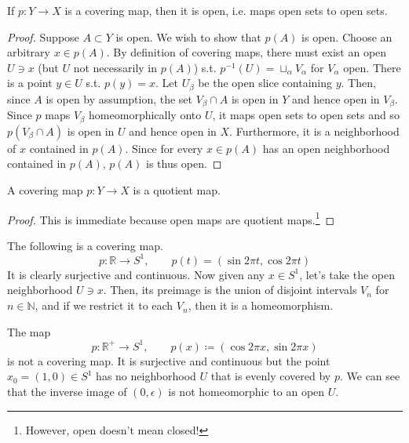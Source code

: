  \begin{theorem}
    If $p: Y \to X$ is a covering map, then it is open, i.e. maps open sets to open sets. 
  \end{theorem}
  \begin{proof}
    Suppose $A \subset Y$ is open. We wish to show that $p(A)$ is open. Choose an arbitrary $x \in p(A)$. By definition of covering maps, there must exist an open $U \ni x$ (but $U$ not necessarily in $p(A)$) s.t. $p^{-1} (U) = \sqcup_\alpha V_\alpha$ for $V_\alpha$ open. There is a point $y \in U$ s.t. $p(y) = x$. Let $U_\beta$ be the open slice containing $y$. Then, since $A$ is open by assumption, the set $V_\beta \cap A$ is open in $Y$ and hence open in $V_\beta$. Since $p$ maps $V_\beta$ homeomorphically onto $U$, it maps open sets to open sets and so $p(V_\beta \cap A)$ is open in $U$ and hence open in $X$. Furthermore, it is a neighborhood of $x$ contained in $p(A)$. Since for every $x \in p(A)$ has an open neighborhood contained in $p(A)$, $p(A)$ is thus open. 
  \end{proof}

  \begin{corollary}
    A covering map $p: Y \to X$ is a quotient map. 
  \end{corollary}
  \begin{proof}
    This is immediate because open maps are quotient maps.\footnote{However, open doesn't mean closed!} 
  \end{proof}

  \begin{example}
    The following is a covering map. 
    \begin{equation}
      p: \mathbb{R} \to S^1, \qquad p(t) = (\sin{2 \pi t}, \cos{2 \pi t})
    \end{equation}
    It is clearly surjective and continuous. Now given any $x \in S^1$, let's take the open neighborhood $U \ni x$. Then, its preimage is the union of disjoint intervals $V_n$ for $n \in \mathbb{N}$, and if we restrict it to each $V_n$, then it is a homeomorphism. 
  \end{example}

  \begin{example}
    The map 
    \begin{equation}
      p: \mathbb{R}^+ \to S^1, \qquad p(x) \coloneqq ( \cos{2 \pi x}, \sin{2\pi x}) 
    \end{equation}
    is not a covering map. It is surjective and continuous but the point $x_0 = (1, 0) \in S^1$ has no neighborhood $U$ that is evenly covered by $p$. We can see that the inverse image of $(0, \epsilon)$ is not homeomorphic to an open $U$. 
  \end{example}

